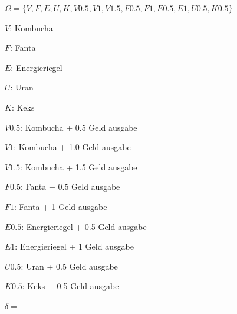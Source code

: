 \stopsectionlevel

\startsectionlevel[title={Ausgabe},reference={ausgabe}]

\startitemize[packed]
\item
  $\Omega = \{V, F, E; U, K, V0.5, V1, V1.5, F0.5, F1, E0.5, E1, U0.5, K0.5\}$
  \startitemize[packed]
  \item
    $V$: Kombucha
  \item
    $F$: Fanta
  \item
    $E$: Energieriegel
  \item
    $U$: Uran
  \item
    $K$: Keks
  \item
    $V0.5$: Kombucha + 0.5 Geld ausgabe
  \item
    $V1$: Kombucha + 1.0 Geld ausgabe
  \item
    $V1.5$: Kombucha + 1.5 Geld ausgabe
  \item
    $F0.5$: Fanta + 0.5 Geld ausgabe
  \item
    $F1$: Fanta + 1 Geld ausgabe
  \item
    $E0.5$: Energieriegel + 0.5 Geld ausgabe
  \item
    $E1$: Energieriegel + 1 Geld ausgabe
  \item
    $U0.5$: Uran + 0.5 Geld ausgabe
  \item
    $K0.5$: Keks + 0.5 Geld ausgabe
  \stopitemize
\stopitemize

\stopsectionlevel

\startsectionlevel[title={Übergangsfunktionen},reference={übergangsfunktionen}]

\startitemize[packed]
\item
  $\delta =$
\stopitemize

